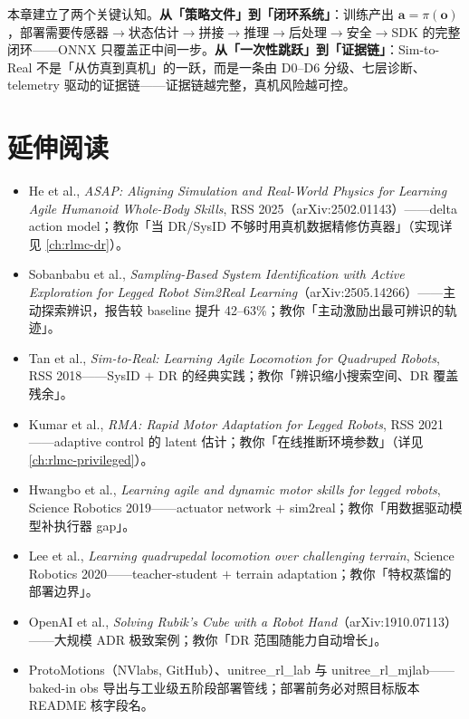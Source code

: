 本章建立了两个关键认知。\textbf{从「策略文件」到「闭环系统」}：训练产出 $\mathbf a=\pi(\mathbf o)$，部署需要传感器$\to$状态估计$\to$拼接$\to$推理$\to$后处理$\to$安全$\to$SDK 的完整闭环——ONNX 只覆盖正中间一步。\textbf{从「一次性跳跃」到「证据链」}：Sim-to-Real 不是「从仿真到真机」的一跃，而是一条由 D0--D6 分级、七层诊断、telemetry 驱动的证据链——证据链越完整，真机风险越可控。

\section*{延伸阅读}
\label{sec:rlmc-s2r-further}

\begin{itemize}
  \item He et al., \emph{ASAP: Aligning Simulation and Real-World Physics for Learning Agile Humanoid Whole-Body Skills}, RSS 2025（arXiv:2502.01143）\cite{asap2025}——delta action model；教你「当 DR/SysID 不够时用真机数据精修仿真器」（实现详见 \cref{ch:rlmc-dr}）。
  \item Sobanbabu et al., \emph{Sampling-Based System Identification with Active Exploration for Legged Robot Sim2Real Learning}（arXiv:2505.14266）\cite{sobanbabu2025spi}——主动探索辨识，报告较 baseline 提升 42--63\%；教你「主动激励出最可辨识的轨迹」。
  \item Tan et al., \emph{Sim-to-Real: Learning Agile Locomotion for Quadruped Robots}, RSS 2018\cite{tan2018simtoreal}——SysID $+$ DR 的经典实践；教你「辨识缩小搜索空间、DR 覆盖残余」。
  \item Kumar et al., \emph{RMA: Rapid Motor Adaptation for Legged Robots}, RSS 2021\cite{kumar2021rma}——adaptive control 的 latent 估计；教你「在线推断环境参数」（详见 \cref{ch:rlmc-privileged}）。
  \item Hwangbo et al., \emph{Learning agile and dynamic motor skills for legged robots}, Science Robotics 2019\cite{hwangbo2019anymal}——actuator network $+$ sim2real；教你「用数据驱动模型补执行器 gap」。
  \item Lee et al., \emph{Learning quadrupedal locomotion over challenging terrain}, Science Robotics 2020\cite{lee2020quadruped}——teacher-student $+$ terrain adaptation；教你「特权蒸馏的部署边界」。
  \item OpenAI et al., \emph{Solving Rubik's Cube with a Robot Hand}（arXiv:1910.07113）\cite{openai2019rubik}——大规模 ADR 极致案例；教你「DR 范围随能力自动增长」。
  \item ProtoMotions（NVlabs, GitHub）\cite{nvlabs_protomotions}、unitree\_rl\_lab\cite{unitree_rl_lab} 与 unitree\_rl\_mjlab\cite{unitree_rl_mjlab}——baked-in obs 导出与工业级五阶段部署管线；部署前务必对照目标版本 README 核字段名。
\end{itemize}

